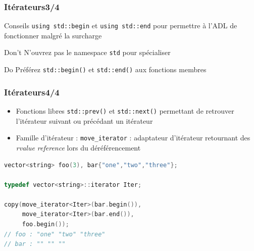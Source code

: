 \documentclass[C++.tex]{subfiles}
\begin{document}
\begin{frame}[fragile]
	\frametitle{Itérateurs\titlehfill{}3/4}
	\begin{block}{Conseils}
		\lstinline|using std::begin| et \lstinline|using std::end| pour permettre à l'ADL de fonctionner malgré la surcharge
	\end{block}

	\begin{alertblock}{Don't}
		N'ouvrez pas le namespace \lstinline|std| pour spécialiser
	\end{alertblock}

	\begin{exampleblock}{Do}
		Préférez \lstinline|std::begin()| et \lstinline|std::end()| aux fonctions membres

	\end{exampleblock}
\end{frame}

\begin{frame}[fragile]
	\frametitle{Itérateurs\titlehfill{}4/4}
	\begin{itemize}
		\item Fonctions libres \lstinline|std::prev()| et \lstinline|std::next()| permettant de retrouver l'itérateur suivant ou précédant un itérateur
		\item Famille d'itérateur : \lstinline|move_iterator| : adaptateur d'itérateur retournant des \textit{rvalue reference} lors du déréférencement
	\end{itemize}

	\begin{lstlisting}[language=C++]
vector<string> foo(3), bar{"one","two","three"};

typedef vector<string>::iterator Iter;

copy(move_iterator<Iter>(bar.begin()),
     move_iterator<Iter>(bar.end()),
     foo.begin());
// foo : "one" "two" "three"
// bar : "" "" ""\end{lstlisting}

\end{frame}
\end{document}
